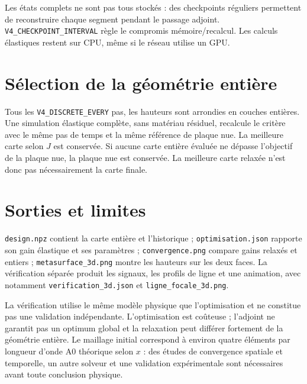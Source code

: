 \documentclass[11pt,a4paper]{article}
\begin{document}
Les états complets ne sont pas tous stockés : des checkpoints réguliers
permettent de reconstruire chaque segment pendant le passage adjoint.
\texttt{V4\_CHECKPOINT\_INTERVAL} règle le compromis mémoire/recalcul.
Les calculs élastiques restent sur CPU, même si le réseau utilise un GPU.

\section{Sélection de la géométrie entière}
Tous les \texttt{V4\_DISCRETE\_EVERY} pas, les hauteurs sont arrondies
en couches entières. Une simulation élastique complète, sans matériau
résiduel, recalcule le critère avec le même pas de temps et la même
référence de plaque nue. La meilleure carte selon \(J\) est conservée.
Si aucune carte entière évaluée ne dépasse l'objectif de la plaque nue,
la plaque nue est conservée. La meilleure carte relaxée n'est donc pas
nécessairement la carte finale.

\section{Sorties et limites}
\texttt{design.npz} contient la carte entière et l'historique ;
\texttt{optimisation.json} rapporte son gain élastique et ses paramètres ;
\texttt{convergence.png} compare gains relaxés et entiers ;
\texttt{metasurface\_3d.png} montre les hauteurs sur les deux faces.
La vérification séparée produit les signaux, les profils de ligne et une
animation, avec notamment \texttt{verification\_3d.json} et
\texttt{ligne\_focale\_3d.png}.

La vérification utilise le même modèle physique que l'optimisation et ne
constitue pas une validation indépendante. L'optimisation est coûteuse ;
l'adjoint ne garantit pas un optimum global et la relaxation peut différer
fortement de la géométrie entière. Le maillage initial correspond à
environ quatre éléments par longueur d'onde A0 théorique selon \(x\) :
des études de convergence spatiale et temporelle, un autre solveur et une
validation expérimentale sont nécessaires avant toute conclusion physique.
\end{document}
